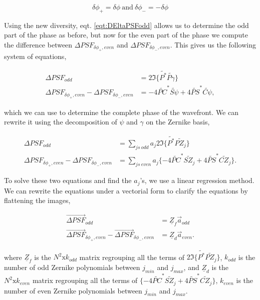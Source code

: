 \begin{equation}
\delta\phi_+ = \delta\phi \mathrm{\ and \ } \delta\phi_- = -\delta\phi
\label{eqt:diversities}
\end{equation}

Using the new diversity, eqt. \eqref{eqt:DEltaPSFodd} allows us to determine the odd part of the phase as before, but now for the even part of the phase we compute the difference between $\Delta PSF_{\delta\phi_+,even}$ and $\Delta PSF_{\delta\phi_-,even}$. This gives us the following system of equations,

\begin{align}
\Delta PSF_{odd} &= 2\Im\lbrace \widetilde{P^*}\widetilde{P \gamma}\rbrace \\
\Delta PSF_{\delta\phi_+, even}-\Delta PSF_{\delta\phi_-, even} &= -4\widetilde{PC}^*\widetilde{S\psi} +4\widetilde{PS}^*\widetilde{C\psi},
\end{align}

which we can use to determine the complete phase of the wavefront. We can rewrite it using the decomposition of $\psi$ and $\gamma$ on the Zernike basis,

\begin{align}
\Delta PSF_{odd} &= \sum\limits_{js\ odd} a_j 2\Im\lbrace \widetilde{P^*}\widetilde{P Z_j}\rbrace \label{eqt:DeltaPSFoddonZernike}\\
\Delta PSF_{\delta\phi_+, even}-\Delta PSF_{\delta\phi_-, even} &= \sum\limits_{js\ even} a_j \lbrace-4\widetilde{PC}^*\widetilde{SZ_j} +4\widetilde{PS}^*\widetilde{CZ_j}\rbrace.\label{eqt:DeltaPSF+-DeltaPSF-evenonZernike}
\end{align}

To solve these two equations and find the $a_j$'s, we use a linear regression method. We can rewrite the equations under a vectorial form to clarify the equations by flattening the images,

\begin{align}
\overrightarrow{\Delta PSF}_{odd} &= \underline{Z}_f\vec{a}_{odd}  \label{eqt:DeltaPSFoddonZernikeMAtrix}\\
\overrightarrow{\Delta PSF}_{\delta\phi_+, even}-\overrightarrow{\Delta PSF}_{\delta\phi_-, even} &= \underline{Z}_d \vec{a}_{even}.\label{eqt:DeltaPSF+-DeltaPSF-evenonZernikeMatrix}
\end{align}

where $\underline{Z}_f$ is the $N^2 \mathrm{x} k_{odd}$ matrix regrouping all the terms of $2\Im\lbrace \widetilde{P^*}\widetilde{P Z_j}\rbrace$, $k_{odd}$ is the number of odd Zernike polynomials between $j_{min}$ and $j_{max}$, and $\underline{Z}_d$ is the $N^2 \mathrm{x} k_{even}$ matrix regrouping all the terms of $\lbrace-4\widetilde{PC}^*\widetilde{SZ_j} +4\widetilde{PS}^*\widetilde{CZ_j}\rbrace$, $k_{even}$ is the number of even Zernike polynomials between $j_{min}$ and $j_{max}$.

